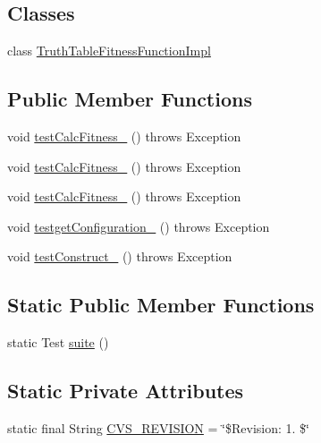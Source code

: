 \subsection*{Classes}
\begin{DoxyCompactItemize}
\item 
class \hyperlink{classorg_1_1jgap_1_1impl_1_1fitness_1_1_truth_table_fitness_function_test_1_1_truth_table_fitness_function_impl}{Truth\-Table\-Fitness\-Function\-Impl}
\end{DoxyCompactItemize}
\subsection*{Public Member Functions}
\begin{DoxyCompactItemize}
\item 
void \hyperlink{classorg_1_1jgap_1_1impl_1_1fitness_1_1_truth_table_fitness_function_test_a6aa764da625d0a52cb07b90bae15c523}{test\-Calc\-Fitness\-\_} ()  throws Exception 
\item 
void \hyperlink{classorg_1_1jgap_1_1impl_1_1fitness_1_1_truth_table_fitness_function_test_a67345ba24d7c25c4d010aaadb6074886}{test\-Calc\-Fitness\-\_} ()  throws Exception 
\item 
void \hyperlink{classorg_1_1jgap_1_1impl_1_1fitness_1_1_truth_table_fitness_function_test_ad35eb165e015e85d77bb554120df524c}{test\-Calc\-Fitness\-\_} ()  throws Exception 
\item 
void \hyperlink{classorg_1_1jgap_1_1impl_1_1fitness_1_1_truth_table_fitness_function_test_ac3fc5e2fa1b8d5c0e48e1e56aa0b5807}{testget\-Configuration\-\_} ()  throws Exception 
\item 
void \hyperlink{classorg_1_1jgap_1_1impl_1_1fitness_1_1_truth_table_fitness_function_test_a11d8692a3eb20d950f00e2c3a468f0c9}{test\-Construct\-\_} ()  throws Exception 
\end{DoxyCompactItemize}
\subsection*{Static Public Member Functions}
\begin{DoxyCompactItemize}
\item 
static Test \hyperlink{classorg_1_1jgap_1_1impl_1_1fitness_1_1_truth_table_fitness_function_test_ae7b288c4f2c809b372f42907d7921f29}{suite} ()
\end{DoxyCompactItemize}
\subsection*{Static Private Attributes}
\begin{DoxyCompactItemize}
\item 
static final String \hyperlink{classorg_1_1jgap_1_1impl_1_1fitness_1_1_truth_table_fitness_function_test_a9a93381bdd631e7ad548cfcc635b7163}{C\-V\-S\-\_\-\-R\-E\-V\-I\-S\-I\-O\-N} = \char`\"{}\$Revision\-: 1. \$\char`\"{}
\end{DoxyCompactItemize}
